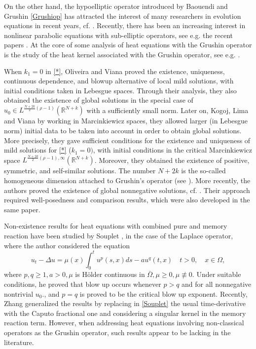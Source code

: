 \documentclass[reqno,11pt]{amsart}
\numberwithin{equation}{section}
\def\R{{\mathbb {R}}}
\def\R{\mathbb{R}}
\begin{document}
On the other hand, the hypoelliptic operator introduced by Baouendi and Grushin \eqref{Grushiop} \cite{Baouendi-67, Grushin} has attracted the interest of many researchers in evolution equations in recent years, cf. \cite{Alves-G-Lo-24, A-14, Calin-11, Chang-Li-12,Gaveau-77,Goldstein-Kogoj, Kogoj-Lan-12,Wu-15}. Recently, there has been an increasing interest in nonlinear parabolic equations with sub-elliptic operators, see e.g. the recent papers \cite{A-14, Bu-Lat-25, Fino-Ruz-Tor-24, Hi-Oka-24, J-T-14, J-Ki-S-16,RuzY-22}. At the core of some analysis of heat equations with the Grushin operator is the study of the heat kernel associated with the Grushin operator, see e.g. \cite{Garofalo-Trallli-22, Oli-Vi-23, Stempak-25}.

When $k_1=0$ in \eqref{*}, Oliveira and Viana \cite{Oli-Vi-23} proved the existence, uniqueness, continuous dependence, and blowup alternative of local mild solutions,
with initial conditions taken in Lebesgue spaces. Through their analysis, they also obtained the existence of global solutions in the special case of $u_0\in L^{\frac{ N + 2k}{2}(\rho-1)}(\R^{N+k})$ with a sufficiently small norm. Later on, Kogoj, Lima and Viana \cite{Kogoj-Lima-Viana-24} by working in Marcinkiewicz  spaces, they allowed larger (in Lebesgue norm) initial data to be taken into account in order to obtain global solutions. More precisely, they gave sufficient conditions for the existence and uniqueness of mild solutions for \eqref{*} ($k_1=0)$, with initial conditions in the critical Marcinkiewicz  space $L^{\frac{N+2k}{2}(\rho-1) ,\infty}(\R^{N+k})$. Moreover, they obtained the existence of positive, symmetric, and self-similar solutions. The number $N+2k$ is the so-called homogeneous dimension attached to Grushin's operator (see \cite{Kogoj-Lan-18}). More recently, the authors proved the existence of global nonnegative solutions, cf. \cite{Fino-Viana-25.1}. Their approach required well-posedness and comparison results, which were also developed in the same paper.

Non-existence results for heat equations with combined pure and memory reaction have been studied by Souplet \cite{Soup-96}, in the case of the Laplace operator, where the author considered the equation
\begin{equation}\label{Souplet}
	u_t-\Delta u=\mu(x) \int_0^t u^p(s, x) d s-a u^q(t, x) \quad t>0, \quad x \in \Omega,
\end{equation}
where $p, q \geq 1, a>0, \mu$ is Hölder continuous in $\bar{\Omega}, \mu \geq 0, \mu \not \equiv 0$. Under suitable conditions, he proved that blow up occurs whenever $p>q$ and for all nonnegative nontrivial $u_0$., and $p=q$ is proved to be the critical blow up exponent. Recently, Zhang \cite{Zh-23} generalized the results by replacing in \eqref{Souplet} the usual time-derivative with the Caputo fractional one and considering a singular kernel in the memory reaction term. However, when addressing heat equations involving non-classical operators as the Grushin operator, such results appear to be lacking in the literature.
\end{document}
